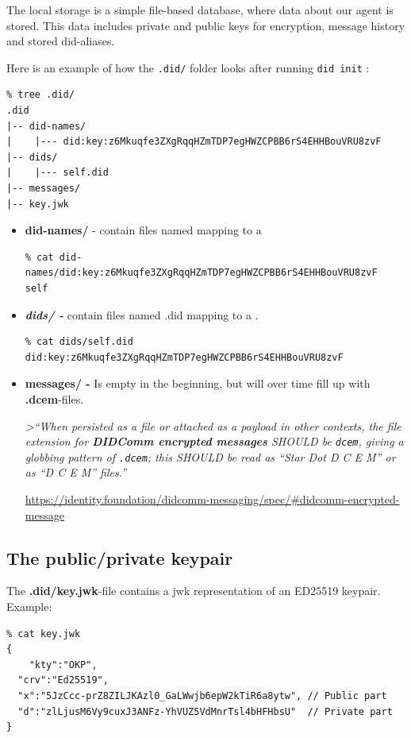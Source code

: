 The local storage is a simple file-based database, where data about our
agent is stored. This data includes private and public keys for
encryption, message history and stored did-aliases.

Here is an example of how the \lstinline!.did/! folder
looks after running \lstinline!did init! :

\begin{lstlisting}
% tree .did/
.did
|-- did-names/
|    |--- did:key:z6Mkuqfe3ZXgRqqHZmTDP7egHWZCPBB6rS4EHHBouVRU8zvF
|-- dids/
|    |--- self.did
|-- messages/
|-- key.jwk
\end{lstlisting}

\begin{itemize}
\item
  \textbf{did-names/} - contain files named mapping to a

\begin{lstlisting}
% cat did-names/did:key:z6Mkuqfe3ZXgRqqHZmTDP7egHWZCPBB6rS4EHHBouVRU8zvF 
self
\end{lstlisting}
\item
  \textbf{\emph{dids/ -}} contain files named .did mapping to a .

\begin{lstlisting}
% cat dids/self.did  
did:key:z6Mkuqfe3ZXgRqqHZmTDP7egHWZCPBB6rS4EHHBouVRU8zvF
\end{lstlisting}
\item
  \textbf{messages/ -} Is empty in the beginning, but will over time
  fill up with \textbf{.dcem}-files.

  \emph{\textgreater{}``When persisted as a file or attached as a
  payload in other contexts, the file extension for \textbf{DIDComm
  encrypted messages} SHOULD be \lstinline!dcem!, giving a
  globbing pattern of \lstinline!.dcem!; this SHOULD be
  read as ``Star Dot D C E M'' or as ``D C E M'' files.''}

  \url{https://identity.foundation/didcomm-messaging/spec/\#didcomm-encrypted-message}
\end{itemize}

\hypertarget{the-publicprivate-keypair}{%
\subsection{The public/private
keypair}\label{the-publicprivate-keypair}}

The \textbf{.did/key.jwk}-file contains a jwk representation of an
ED25519 keypair. Example:

\begin{lstlisting}
% cat key.jwk 
{
    "kty":"OKP",
  "crv":"Ed25519",
  "x":"5JzCcc-prZ8ZILJKAzl0_GaLWwjb6epW2kTiR6a8ytw", // Public part
  "d":"zlLjusM6Vy9cuxJ3ANFz-YhVUZ5VdMnrTsl4bHFHbsU"  // Private part
}
\end{lstlisting}

